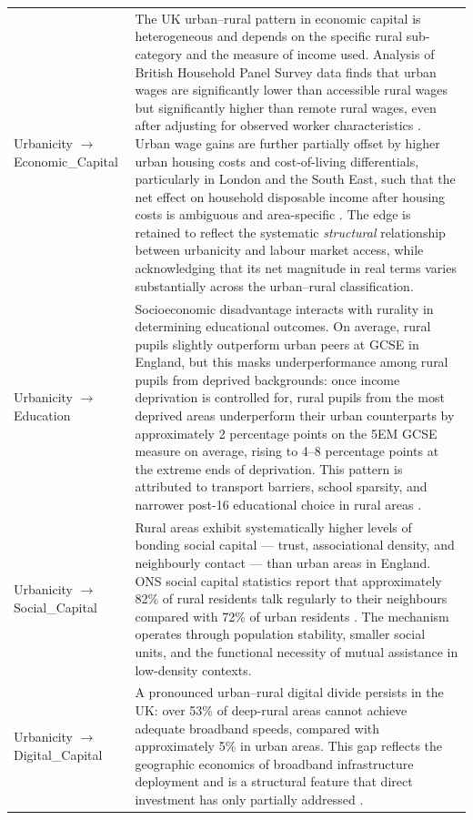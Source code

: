 \begin{longtable}{@{}p{3.8cm}p{11.2cm}@{}}
\addlinespace
Urbanicity $\to$ Economic\_Capital & The UK urban–rural pattern in economic capital is heterogeneous and depends on the specific rural sub-category and the measure of income used. Analysis of British Household Panel Survey data finds that urban wages are significantly lower than accessible rural wages but significantly higher than remote rural wages, even after adjusting for observed worker characteristics \citep{gilbert_low_2003}. Urban wage gains are further partially offset by higher urban housing costs and cost-of-living differentials, particularly in London and the South East, such that the net effect on household disposable income after housing costs is ambiguous and area-specific \citep{waters_housing_2023}. The edge is retained to reflect the systematic \textit{structural} relationship between urbanicity and labour market access, while acknowledging that its net magnitude in real terms varies substantially across the urban–rural classification. \\
\addlinespace
Urbanicity $\to$ Education & Socioeconomic disadvantage interacts with rurality in determining educational outcomes. On average, rural pupils slightly outperform urban peers at GCSE in England, but this masks underperformance among rural pupils from deprived backgrounds: once income deprivation is controlled for, rural pupils from the most deprived areas underperform their urban counterparts by approximately 2 percentage points on the 5EM GCSE measure on average, rising to 4–8 percentage points at the extreme ends of deprivation. This pattern is attributed to transport barriers, school sparsity, and narrower post-16 educational choice in rural areas \citep{graham_grass_2024, zahl-thanem_spatial_2024}. \\
\addlinespace
Urbanicity $\to$ Social\_Capital & Rural areas exhibit systematically higher levels of bonding social capital — trust, associational density, and neighbourly contact — than urban areas in England. ONS social capital statistics report that approximately 82\% of rural residents talk regularly to their neighbours compared with 72\% of urban residents \citep{office_for_national_statistics_social_2022}. The mechanism operates through population stability, smaller social units, and the functional necessity of mutual assistance in low-density contexts. \\
\addlinespace
Urbanicity $\to$ Digital\_Capital & A pronounced urban–rural digital divide persists in the UK: over 53\% of deep-rural areas cannot achieve adequate broadband speeds, compared with approximately 5\% in urban areas. This gap reflects the geographic economics of broadband infrastructure deployment and is a structural feature that direct investment has only partially addressed \citep{philip_digital_2017}. \\
\end{longtable}

